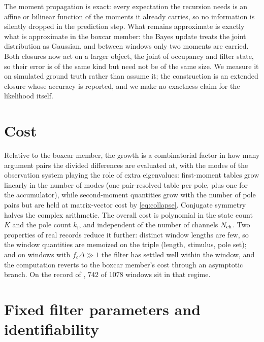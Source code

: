 \documentclass[11pt]{article}
\begin{document}
The moment propagation is exact: every expectation the recursion needs is
an affine or bilinear function of the moments it already carries, so no
information is silently dropped in the prediction step. What remains
approximate is exactly what is approximate in the boxcar member: the
Bayes update treats the joint distribution as Gaussian, and between
windows only two moments are carried. Both closures now act on a larger
object, the joint of occupancy and filter state, so their error is of the
same kind but need not be of the same size. We measure it on simulated
ground truth rather than assume it; the construction is an extended
closure whose accuracy is reported, and we make no exactness claim for
the likelihood itself.

\section{Cost}

Relative to the boxcar member, the growth is a combinatorial factor in
how many argument pairs the divided differences are evaluated at, with
the modes of the observation system playing the role of extra
eigenvalues: first-moment tables grow linearly in the number of modes
(one pair-resolved table per pole, plus one for the accumulator), while
second-moment quantities grow with the number of pole pairs but are held
at matrix-vector cost by \eqref{eq:collapse}. Conjugate symmetry halves
the complex arithmetic. The overall cost is polynomial in the state count
$K$ and the pole count $k_{\mathrm{f}}$, and independent of the number of
channels $N_{\mathrm{ch}}$. Two properties of real records reduce it further:
distinct window lengths are few, so the window quantities are memoized on
the triple (length, stimulus, pole set); and on windows with
$f_c\Delta \gg 1$ the filter has settled well within the window, and the
computation reverts to the boxcar member's cost through an asymptotic
branch. On the record of \cite{moffatt2007}, 742 of 1078 windows sit in
that regime.

\section{Fixed filter parameters and identifiability}
\end{document}
